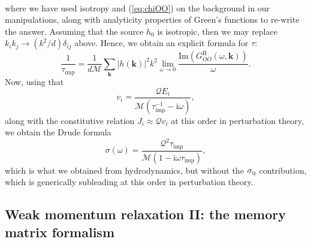\documentclass[10pt, oneside]{book}
\begin{document}
\begin{doublespace}
\begin{align}
\end{align}
where we have used isotropy and (\ref{eq:chiOO}) on the background in our manipulations, along with analyticity properties of Green's functions to re-write the answer.   Assuming that the source $h_0$ is isotropic, then we may replace $k_i k_j \rightarrow (k^2/d) \delta_{ij}$ above.   Hence, we obtain an explicit formula for $\tau$: \begin{equation}
\frac{1}{\tau_{\mathrm{imp}}} = \frac{1}{d\mathcal{M}} \sum_{\mathbf{k}} |h(\mathbf{k})|^2 k^2 \lim_{\omega\rightarrow 0} \frac{\mathrm{Im}\left(G^{\mathrm{R}}_{OO}(\omega,\mathbf{k})\right)}{\omega}.  \label{eq:memmatrixtime}
\end{equation}
Now, using that \begin{equation}
v_i = \frac{\mathcal{Q}E_i}{\mathcal{M}(\tau_{\mathrm{imp}}^{-1}-\mathrm{i}\omega)},
\end{equation} 
along with the constitutive relation $J_i \approx \mathcal{Q}v_i$ at this order in perturbation theory, we obtain the Drude formula
\begin{equation}
\sigma(\omega) = \frac{\mathcal{Q}^2\tau_{\mathrm{imp}}}{\mathcal{M}(1-\mathrm{i}\omega \tau_{\mathrm{imp}})},  \label{eq:memdrude}
\end{equation}
which is what we obtained from hydrodynamics, but without the $\sigma_{\textsc{q}}$ contribution, which is generically subleading at this order in perturbation theory.

\subsection{Weak momentum relaxation II:  the memory matrix formalism}\label{sec:memorymatrix}




\end{doublespace}
\end{document}
